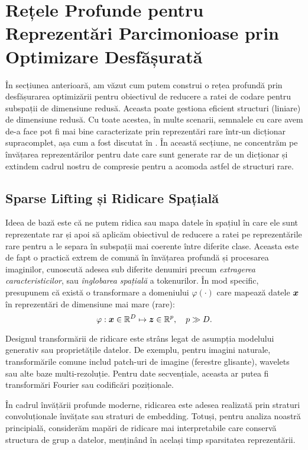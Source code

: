 \documentclass[../../book-main_ro.tex]{subfiles}
\begin{document}
\section{Rețele Profunde pentru Reprezentări Parcimonioase prin Optimizare Desfășurată}\label{sec:deep-sparse-coding}

În secțiunea anterioară, am văzut cum putem construi o rețea profundă prin desfășurarea optimizării pentru obiectivul de reducere a ratei de codare pentru subspații de dimensiune redusă. 
Aceasta poate gestiona eficient structuri (liniare) de dimensiune redusă. 
Cu toate acestea, în multe scenarii, semnalele cu care avem de-a face pot fi mai bine caracterizate prin reprezentări rare într-un dicționar supracomplet, așa cum a fost discutat în . În această secțiune, ne concentrăm pe învățarea reprezentărilor pentru date care sunt generate rar de un dicționar și extindem cadrul nostru de compresie pentru a acomoda astfel de structuri rare.

\subsection{Sparse Lifting și Ridicare Spațială}
\label{subsec:lifting}

Ideea de bază este că ne putem ridica sau mapa datele în spațiul în care ele sunt reprezentate rar și apoi să aplicăm obiectivul de reducere a ratei pe reprezentările rare pentru a le separa în subspații mai coerente între diferite clase. Aceasta este de fapt o practică extrem de comună în învățarea profundă și procesarea imaginilor, cunoscută adesea sub diferite denumiri precum {\em extragerea caracteristicilor}, sau {\em înglobarea spațială} a tokenurilor. În mod specific, presupunem că există o transformare a domeniului $\varphi(\cdot)$ care mapează datele $\bm{x}$ în reprezentări de dimensiune mai mare (rare):
\begin{equation}
    \varphi: \bm{x} \in \mathbb{R}^D \mapsto \bm{z} \in \mathbb{R}^p, \quad p \gg D.
\end{equation}

Designul transformării de ridicare este strâns legat de asumpția modelului generativ sau proprietățile datelor. De exemplu, pentru imagini naturale, transformările comune includ patch-uri de imagine (ferestre glisante), wavelets sau alte baze multi-rezoluție. Pentru date secvențiale, aceasta ar putea fi transformări Fourier sau codificări poziționale. 

În cadrul învățării profunde moderne, ridicarea este adesea realizată prin straturi convoluționale învățate sau straturi de embedding. Totuși, pentru analiza noastră principială, considerăm mapări de ridicare mai interpretabile care conservă structura de grup a datelor, menținând în același timp sparsitatea reprezentării.
\end{document}
